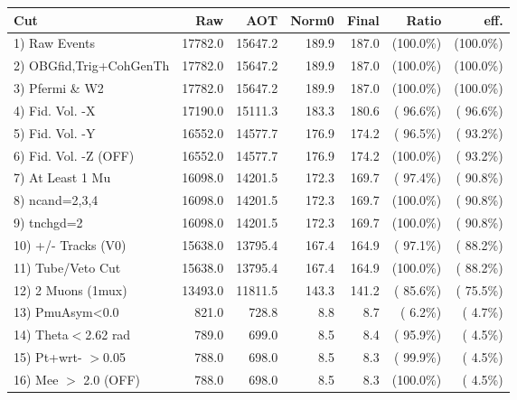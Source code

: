  \begin{table}[h!]\centering
 \begin{tabular}{||l||r|r|r|r|r|r||}
 \hline
 \hline
 Cut & Raw & AOT & Norm0 & Final & Ratio & eff.       \\
 \hline
  1) Raw Events           &      17782.0 &      15647.2 &        189.9 &        187.0 & (100.0\%) & (100.0\%) \\
  2) OBGfid,Trig+CohGenTh &      17782.0 &      15647.2 &        189.9 &        187.0 & (100.0\%) & (100.0\%) \\
  3) Pfermi \& W2         &      17782.0 &      15647.2 &        189.9 &        187.0 & (100.0\%) & (100.0\%) \\
  4) Fid. Vol. -X         &      17190.0 &      15111.3 &        183.3 &        180.6 & ( 96.6\%) & ( 96.6\%) \\
  5) Fid. Vol. -Y         &      16552.0 &      14577.7 &        176.9 &        174.2 & ( 96.5\%) & ( 93.2\%) \\
  6) Fid. Vol. -Z (OFF)   &      16552.0 &      14577.7 &        176.9 &        174.2 & (100.0\%) & ( 93.2\%) \\
  7) At Least 1 Mu        &      16098.0 &      14201.5 &        172.3 &        169.7 & ( 97.4\%) & ( 90.8\%) \\
  8) ncand=2,3,4          &      16098.0 &      14201.5 &        172.3 &        169.7 & (100.0\%) & ( 90.8\%) \\
  9) tnchgd=2             &      16098.0 &      14201.5 &        172.3 &        169.7 & (100.0\%) & ( 90.8\%) \\
 10) +/- Tracks (V0)      &      15638.0 &      13795.4 &        167.4 &        164.9 & ( 97.1\%) & ( 88.2\%) \\
 11) Tube/Veto Cut        &      15638.0 &      13795.4 &        167.4 &        164.9 & (100.0\%) & ( 88.2\%) \\
 12) 2 Muons (1mux)       &      13493.0 &      11811.5 &        143.3 &        141.2 & ( 85.6\%) & ( 75.5\%) \\
 13) PmuAsym<0.0          &        821.0 &        728.8 &          8.8 &          8.7 & (  6.2\%) & (  4.7\%) \\
 14) Theta$<$2.62 rad     &        789.0 &        699.0 &          8.5 &          8.4 & ( 95.9\%) & (  4.5\%) \\
 15) Pt+wrt- $>$0.05      &        788.0 &        698.0 &          8.5 &          8.3 & ( 99.9\%) & (  4.5\%) \\
 16) Mee $>$ 2.0  (OFF)   &        788.0 &        698.0 &          8.5 &          8.3 & (100.0\%) & (  4.5\%) \\

\end{tabular}
\end{table}
